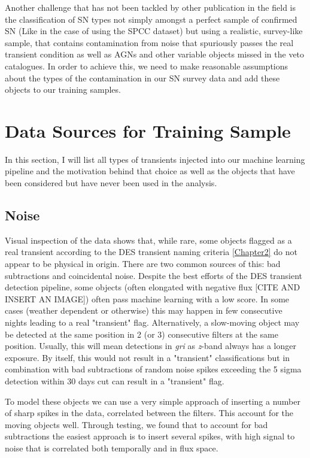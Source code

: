 Another challenge that has not been tackled by other publication in the field is the classification of SN types not simply amongst a perfect sample of confirmed SN (Like in the case of using the SPCC dataset) but using a realistic, survey-like sample, that contains contamination from noise that spuriously passes the real transient condition as well as AGNs and other variable objects missed in the veto catalogues. In order to achieve this, we need to make reasonable assumptions about the types of the contamination in our SN survey data and add these objects to our training samples.

\section{Data Sources for Training Sample}
In this section, I will list all types of transients injected into our machine learning pipeline and the motivation behind that choice as well as the objects that have been considered but have never been used in the analysis.

\subsection{Noise}
Visual inspection of the data shows that, while rare, some objects flagged as a real transient according to the DES transient naming criteria \cref{Chapter2} do not appear to be physical in origin. There are two common sources of this: bad subtractions and coincidental noise. Despite the best efforts of the DES transient detection pipeline, some objects (often elongated with negative flux [CITE AND INSERT AN IMAGE]) often pass machine learning with a low score. In some cases (weather dependent or otherwise) this may happen in few consecutive nights leading to a real "transient" flag. Alternatively, a slow-moving object may be detected at the same position in 2 (or 3) consecutive filters at the same position. Usually, this will mean detections in \textit{gri} as \textit{z}-band always has a longer exposure. By itself, this would not result in a "transient" classifications but in combination with bad subtractions of random noise spikes exceeding the 5 sigma detection within 30 days cut can result in a "transient" flag.

To model these objects we can use a very simple approach of inserting a number of sharp spikes in the data, correlated between the filters. This account for the moving objects well. Through testing, we found that to account for bad subtractions the easiest approach is to insert several spikes, with high signal to noise that is correlated both temporally and in flux space.

